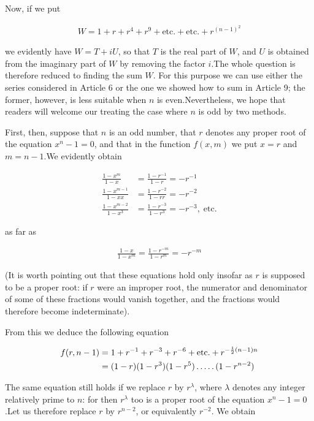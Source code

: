 
Now, if we put

\[
\begin{aligned}
W=1+r+r^4+r^9+\text{etc.}+\text{etc.}+r^{(n-1)^2}
\end{aligned}
\]

we evidently have $W=T+iU$, so that $T$ is the real part of $W$, and $U$ is obtained from the imaginary part of $W$ by removing the factor $i$.\quad The whole question is therefore reduced to finding the sum $W$. For this purpose we can use either the series considered in Article 6 or the one we showed how to sum in Article 9; the former, however, is less suitable when $n$ is even.\quad Nevertheless, we hope that readers will welcome our treating the case where $n$ is odd by two methods.

First, then, suppose that $n$ is an odd number, that $r$ denotes any proper root of the equation $x^n-1=0$, and that in the function $f(x,m)$ we put $x=r$ and $m=n-1$.\quad We evidently obtain

\[
\begin{aligned}
\frac{1-x^m}{1-x}&=\frac{1-r^{-1}}{1-r}=-r^{-1}\\
\frac{1-x^{m-1}}{1-xx}&=\frac{1-r^{-2}}{1-rr}=-r^{-2}\\
\frac{1-x^{m-2}}{1-x^3}&=\frac{1-r^{-3}}{1-r^3}=-r^{-3},\;\text{etc.}
\end{aligned}
\]

as far as

\[
\begin{aligned}
\frac{1-x}{1-x^m}=\frac{1-r^{-m}}{1-r^m}=-r^{-m}
\end{aligned}
\]

(It is worth pointing out that these equations hold only insofar as $r$ is supposed to be a proper root: if $r$ were an improper root, the numerator and denominator of some of these fractions would vanish together, and the fractions would therefore become indeterminate).

From this we deduce the following equation


\[
\begin{aligned}
f(r,n-1)&=1+r^{-1}+r^{-3}+r^{-6}+\text{etc.}+r^{-\frac12(n-1)n}\\
&=(1-r)(1-r^3)(1-r^5)\mathinner{.\,.\,.\,.\,.}(1-r^{n-2})
\end{aligned}
\]

The same equation still holds if we replace $r$ by $r^\lambda$, where $\lambda$ denotes any integer relatively prime to $n$: for then $r^\lambda$ too is a proper root of the equation $x^n-1=0$.\quad Let us therefore replace $r$ by $r^{n-2}$, or equivalently $r^{-2}$. We obtain

